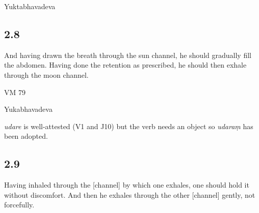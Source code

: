 \begin{ekdosis}
\begin{testimonia}[hp02_007]
Yuktabhavadeva

\begin{versinnote}
\end{versinnote}
\end{testimonia}

\begin{philcomm}[hp02_007]

\end{philcomm}

\subsection*{2.8}
\begin{translation}[hp02_008]
And having drawn the breath through the sun channel, he should gradually fill the abdomen. Having done the retention as prescribed, he should then exhale through the moon channel.
\end{translation}

\begin{sources}[hp02_008]
VM 79

\begin{versinnote}
\end{versinnote}
\end{sources}

\begin{testimonia}[hp02_008]
Yukabhavadeva

\begin{versinnote}
\end{versinnote}
\end{testimonia}

\begin{philcomm}[hp02_008]
\emph{udare} is well-attested (V1 and J10) but the verb needs an object so \emph{udaraṃ} has been adopted.
\end{philcomm}

\subsection*{2.9}
\begin{translation}[hp02_009]
Having inhaled through the [channel] by which one exhales, one should hold it without discomfort. And then he exhales through the other [channel] gently, not forcefully.
\end{translation}


\end{ekdosis}
